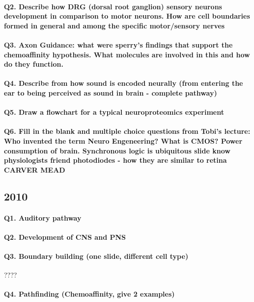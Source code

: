 \documentclass[12pt,article,oneside,a4paper]{memoir}
\begin{document}
\paragraph{Q2. Describe how DRG (dorsal root ganglion) sensory neurons development in comparison to motor neurons. How are cell boundaries formed in general and among the specific motor/sensory nerves}
\paragraph{Q3. Axon Guidance: what were sperry's findings that support the chemoaffinity hypothesis. What molecules are involved in this and how do they function.}
\paragraph{Q4. Describe from how sound is encoded neurally (from entering the ear to being perceived as sound in brain - complete pathway)}
\paragraph{Q5. Draw a flowchart for a typical neuroproteomics experiment}
\paragraph{Q6. Fill in the blank and multiple choice questions from Tobi's lecture: Who invented the term Neuro Engeneering? What is CMOS? Power consumption of brain. Synchronous logic is ubiquitous slide know physiologists friend photodiodes - how they are similar to retina CARVER MEAD}


\subsection{2010}
\paragraph{Q1. Auditory pathway}
\paragraph{Q2. Development of CNS and PNS}
\paragraph{Q3. Boundary building (one slide, different cell type)} ????
\paragraph{Q4. Pathfinding (Chemoaffinity, give 2 examples)}
\end{document}
